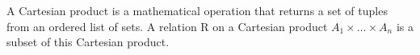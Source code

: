 
\begin{definition}
A Cartesian product is a mathematical operation that returns a set of tuples from an ordered list of sets.
A {\myem relation R} on a Cartesian product $A_1 \times \ldots \times A_n$ 
is a subset of this Cartesian product.

\end{definition}

\begin{definition}
	
\end{definition}